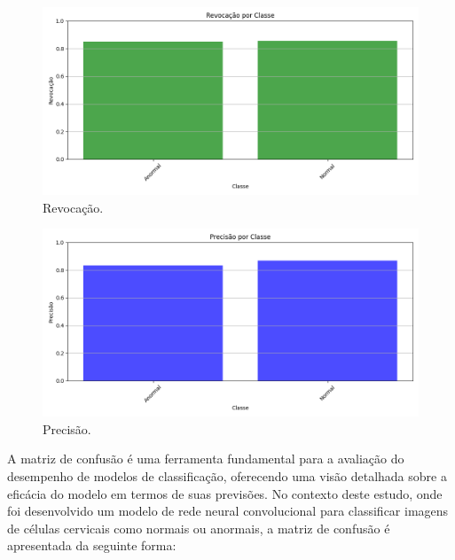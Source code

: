 \begin{figure}[H]
    \centering
    \includegraphics[width=1.0\textwidth]{figuras/revocacao.png}
    \caption{Revocação.}
    \label{fig:nome_da_imagem}
\end{figure}

\begin{figure}[H]
    \centering
    \includegraphics[width=1.0\textwidth]{figuras/precisao.png}
    \caption{Precisão.}
    \label{fig:nome_da_imagem}
\end{figure}

A matriz de confusão é uma ferramenta fundamental para a avaliação do desempenho de modelos de classificação, oferecendo uma visão detalhada sobre a eficácia do modelo em termos de suas previsões. No contexto deste estudo, onde foi desenvolvido um modelo de rede neural convolucional para classificar imagens de células cervicais como normais ou anormais, a matriz de confusão é apresentada da seguinte forma:


